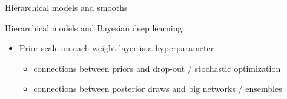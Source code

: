 \documentclass[finnish,english,t]{beamer}
\begin{document}
\begin{frame}{Hierarchical models and smooths}

  
\end{frame}

\begin{frame}{Hierarchical models and Bayesian deep learning}

  \begin{itemize}
  \item Prior scale on each weight layer is a hyperparameter
    \begin{itemize}
    \item connections between priors and drop-out / stochastic optimization
    \item connections between posterior draws and big networks / ensembles
    \end{itemize}
  \end{itemize}
  
\end{frame}
\end{document}
